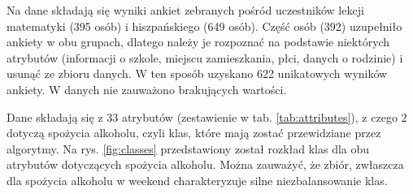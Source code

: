 Na dane składają się wyniki ankiet zebranych pośród uczestników lekcji matematyki (395 osób) i hiszpańskiego (649 osób). Część osób (392) uzupełniło ankiety w obu grupach, dlatego należy je rozpoznać na podstawie niektórych atrybutów (informacji o szkole, miejscu zamieszkania, płci, danych o rodzinie) i usunąć ze zbioru danych. W ten sposób uzyskano 622 unikatowych wyników ankiety. W danych nie zauważono brakujących wartości.

Dane składają się z 33 atrybutów (zestawienie w tab. \ref{tab:attributes}), z czego 2 dotyczą spożycia alkoholu, czyli klas, które mają zostać przewidziane przez algorytmy. Na rys. \ref{fig:classes} przedstawiony został rozkład klas dla obu atrybutów dotyczących spożycia alkoholu. Można zauważyć, że zbiór, zwłaszcza dla spożycia alkoholu w weekend charakteryzuje silne niezbalansowanie klas. 

